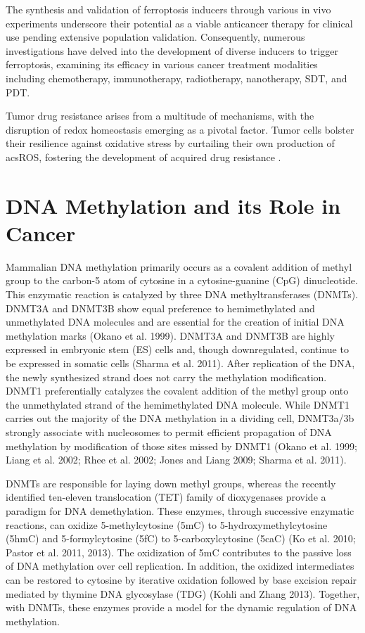The synthesis and validation of ferroptosis inducers through various in vivo experiments underscore their potential as a viable anticancer therapy for clinical use pending extensive population validation. Consequently, numerous investigations have delved into the development of diverse inducers to trigger ferroptosis, examining its efficacy in various cancer treatment modalities including chemotherapy, immunotherapy, radiotherapy, nanotherapy, SDT, and PDT.

Tumor drug resistance arises from a multitude of mechanisms, with the disruption of redox homeostasis emerging as a pivotal factor. Tumor cells bolster their resilience against oxidative stress by curtailing their own production of acs{ROS}, fostering the development of acquired drug resistance \citep{ferro_res}.

\section{DNA Methylation and its Role in Cancer}

Mammalian DNA methylation primarily occurs as a covalent addition of methyl group to the carbon-5 atom of cytosine in a cytosine-guanine (CpG) dinucleotide. This enzymatic reaction is catalyzed by three DNA methyltransferases (DNMTs). DNMT3A and DNMT3B show equal preference to hemimethylated and unmethylated DNA molecules and are essential for the creation of initial DNA methylation marks (Okano et al. 1999). DNMT3A and DNMT3B are highly expressed in embryonic stem (ES) cells and, though downregulated, continue to be expressed in somatic cells (Sharma et al. 2011). After replication of the DNA, the newly synthesized strand does not carry the methylation modification. DNMT1 preferentially catalyzes the covalent addition of the methyl group onto the unmethylated strand of the hemimethylated DNA molecule. While DNMT1 carries out the majority of the DNA methylation in a dividing cell, DNMT3a/3b strongly associate with nucleosomes to permit efficient propagation of DNA methylation by modification of those sites missed by DNMT1 (Okano et al. 1999; Liang et al. 2002; Rhee et al. 2002; Jones and Liang 2009; Sharma et al. 2011).

DNMTs are responsible for laying down methyl groups, whereas the recently identified ten-eleven translocation (TET) family of dioxygenases provide a paradigm for DNA demethylation. These enzymes, through successive enzymatic reactions, can oxidize 5-methylcytosine (5mC) to 5-hydroxymethylcytosine (5hmC) and 5-formylcytosine (5fC) to 5-carboxylcytosine (5caC) (Ko et al. 2010; Pastor et al. 2011, 2013). The oxidization of 5mC contributes to the passive loss of DNA methylation over cell replication. In addition, the oxidized intermediates can be restored to cytosine by iterative oxidation followed by base excision repair mediated by thymine DNA glycosylase (TDG) (Kohli and Zhang 2013). Together, with DNMTs, these enzymes provide a model for the dynamic regulation of DNA methylation.

